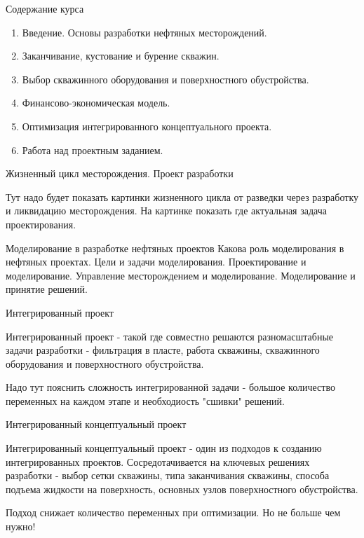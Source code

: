 \begin{frame}{Содержание курса}
\begin{enumerate}
    \item Введение. Основы разработки нефтяных месторождений.
    \item Заканчивание, кустование и бурение скважин.
    \item Выбор скважинного оборудования и поверхностного обустройства.
    \item Финансово-экономическая модель.
    \item Оптимизация интегрированного концептуального проекта. 
    \item Работа над проектным заданием.
\end{enumerate}
\end{frame}

%
\begin{frame}{Жизненный цикл месторождения. Проект разработки}

Тут надо будет показать картинки жизненного цикла от разведки через разработку и ликвидацию месторождения. 
На картинке показать где актуальная задача проектирования. 

\end{frame}

\begin{frame}{Моделирование в разработке нефтяных проектов}
Какова роль моделирования в нефтяных проектах. Цели и задачи моделирования. Проектирование и моделирование. Управление месторождением и моделирование. Моделирование и принятие решений. 
\end{frame}

\begin{frame}{Интегрированный проект}

Интегрированный проект - такой где совместно решаются разномасштабные задачи разработки - фильтрация в пласте, работа скважины, скважинного оборудования и поверхностного обустройства.

Надо тут пояснить сложность интегрированной задачи - большое количество переменных на каждом этапе и необходиость "сшивки" решений.
    
\end{frame}

\begin{frame}{Интегрированный концептуальный проект}

Интегрированный концептуальный проект - один из подходов к созданию интегрированных проектов. Сосредотачивается на ключевых решениях разработки - выбор сетки скважины, типа заканчивания скважины, способа подъема жидкости на поверхность, основных узлов поверхностного обустройства.

Подход снижает количество переменных при оптимизации. Но не больше чем нужно!
    
\end{frame}


